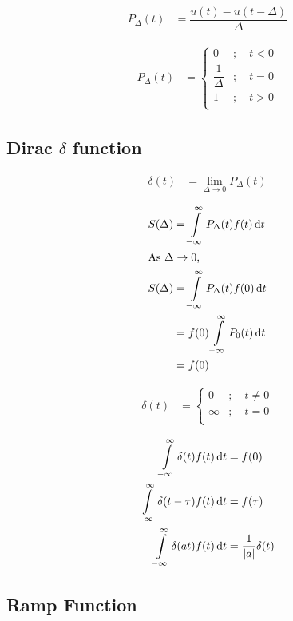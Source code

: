 \documentclass[fleqn, a4paper, 12pt, twoside]{article}
\theoremstyle{definition}
\theoremstyle{theorem}
\begin{document}
\begin{align*}
	P_{\Delta}(t) &= \dfrac{u(t) - u(t - \Delta)}{\Delta}
\end{align*}

\begin{align*}
	P_{\Delta}(t) &=
		\begin{cases}
			0 &;\quad t < 0\\
			\dfrac{1}{\Delta} &;\quad t = 0\\
			1 &;\quad t > 0\\
		\end{cases}
\end{align*}

\subsection{Dirac $\delta$ function}

\begin{align*}
	\delta(t) &= \lim\limits_{\Delta \to 0} P_{\Delta}(t)
\end{align*}

\begin{align*}
	S(\Delta) &= \int\limits_{-\infty}^{\infty} P_{\Delta}(t) f(t) \dif t\\
	\intertext{As $\Delta \to 0$,}
	S(\Delta) &= \int\limits_{-\infty}^{\infty} P_{\Delta}(t) f(0) \dif t\\
	&= f(0) \int\limits_{-\infty}^{\infty} P_0(t) \dif t\\
	&= f(0)
\end{align*}

\begin{align*}
	\delta(t) &=
		\begin{cases}
			0 &;\quad t \neq 0\\
			\infty &;\quad t = 0\\
		\end{cases}
\end{align*}

\begin{align*}
	\int\limits_{-\infty}^{\infty} \delta(t) f(t) \dif t &= f(0)\\
	\int\limits_{-\infty}^{\infty} \delta(t - \tau) f(t) \dif t &= f(\tau)\\
	\int\limits_{-\infty}^{\infty} \delta(a t) f(t) \dif t &= \dfrac{1}{|a|} \delta(t)
\end{align*}

\subsection{Ramp Function}
\end{document}
